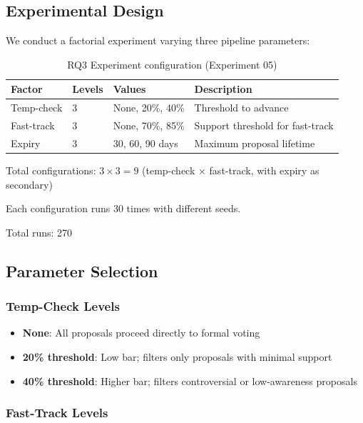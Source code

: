
\subsection{Experimental Design}

We conduct a factorial experiment varying three pipeline parameters:

\begin{table}[htbp]
\centering
\caption{RQ3 Experiment configuration (Experiment 05)}
\label{tab:rq3-experiment}
\begin{tabular}{@{}llll@{}}
\toprule
Factor & Levels & Values & Description \\
\midrule
Temp-check & 3 & None, 20\%, 40\% & Threshold to advance \\
Fast-track & 3 & None, 70\%, 85\% & Support threshold for fast-track \\
Expiry & 3 & 30, 60, 90 days & Maximum proposal lifetime \\
\bottomrule
\end{tabular}
\end{table}

Total configurations: $3 \times 3 = 9$ (temp-check $\times$ fast-track, with expiry as secondary)

Each configuration runs 30 times with different seeds.

Total runs: 270

\subsection{Parameter Selection}

\subsubsection{Temp-Check Levels}

\begin{itemize}
    \item \textbf{None}: All proposals proceed directly to formal voting
    \item \textbf{20\% threshold}: Low bar; filters only proposals with minimal support
    \item \textbf{40\% threshold}: Higher bar; filters controversial or low-awareness proposals
\end{itemize}

\subsubsection{Fast-Track Levels}

